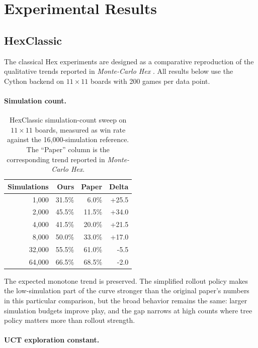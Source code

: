 \documentclass[11pt,a4paper]{article}
\begin{document}
\section{Experimental Results}

\subsection{HexClassic}

The classical Hex experiments are designed as a comparative reproduction of the
qualitative trends reported in \emph{Monte-Carlo Hex}
\cite{cazenave2010montecarlohex}. All results below use the Cython backend on
$11\times 11$ boards with 200 games per data point.

\paragraph{Simulation count.}

\begin{table}[t]
\centering
\begin{tabular}{@{}rrrr@{}}
\toprule
Simulations & Ours & Paper & Delta \\
\midrule
1{,}000  & 31.5\% & 6.0\%  & +25.5 \\
2{,}000  & 45.5\% & 11.5\% & +34.0 \\
4{,}000  & 41.5\% & 20.0\% & +21.5 \\
8{,}000  & 50.0\% & 33.0\% & +17.0 \\
32{,}000 & 55.5\% & 61.0\% & -5.5  \\
64{,}000 & 66.5\% & 68.5\% & -2.0  \\
\bottomrule
\end{tabular}
\caption{HexClassic simulation-count sweep on $11\times 11$ boards, measured as
win rate against the 16{,}000-simulation reference. The ``Paper'' column is the
corresponding trend reported in \emph{Monte-Carlo Hex}.}
\label{tab:hexclassic-simulations}
\end{table}

The expected monotone trend is preserved. The simplified rollout policy makes
the low-simulation part of the curve stronger than the original paper's numbers
in this particular comparison, but the broad behavior remains the same: larger
simulation budgets improve play, and the gap narrows at high counts where tree
policy matters more than rollout strength.

\paragraph{UCT exploration constant.}
\end{document}
